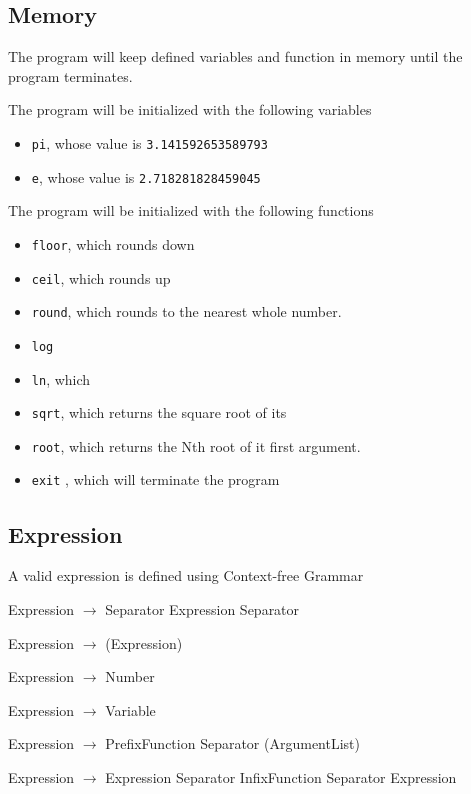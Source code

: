 \documentclass[11pt,a4paper]{article}
\begin{document}
\subsection{Memory}
The program will keep defined variables and function in memory
until the program terminates.


The program will be initialized with the following variables
\begin{itemize}
\item \texttt{pi}, whose value is \texttt{3.141592653589793}
\item \texttt{e}, whose value is \texttt{2.718281828459045}
\end{itemize}


The program will be initialized with the following functions
\begin{itemize}
\item \texttt{floor}, which rounds down
\item \texttt{ceil}, which rounds up
\item \texttt{round}, which rounds to the nearest  whole number.
\item \texttt{log}
\item \texttt{ln}, which
\item \texttt{sqrt}, which returns the square root of its
\item \texttt{root}, which returns the Nth root of it first argument.  %
\item \texttt{exit} , which will terminate the program
\end{itemize}



\subsection{Expression}
A valid expression is defined using Context-free Grammar

Expression \(\rightarrow\) Separator Expression Separator

Expression \(\rightarrow\) (Expression)

Expression \(\rightarrow\) Number

Expression \(\rightarrow\) Variable

Expression \(\rightarrow\) PrefixFunction Separator (ArgumentList)

Expression \(\rightarrow\) Expression Separator InfixFunction Separator Expression
\end{document}
